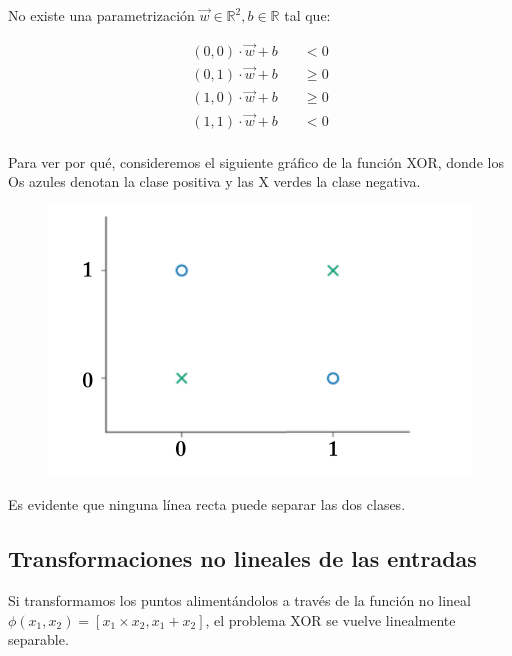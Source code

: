 No existe una parametrización $\vec{w} \in \mathbb{R}^2, b \in \mathbb{R}$ tal que:

\begin{equation}
\begin{split}
(0,0) \cdot \vec{w} + b \quad & < 0 \\
(0,1) \cdot \vec{w} + b \quad & \geq 0 \\
(1,0) \cdot \vec{w} + b \quad & \geq 0 \\
(1,1) \cdot \vec{w} + b \quad & < 0 \\
\end{split}
\end{equation}

Para ver por qué, consideremos el siguiente gráfico de la función XOR, donde los Os azules denotan la clase positiva y las X verdes la clase negativa.

\begin{figure}[htb]
	\centering
	 \includegraphics[scale=0.35]{pics/xor.png}
\end{figure}

Es evidente que ninguna línea recta puede separar las dos clases.


\subsection{Transformaciones no lineales de las entradas}
Si transformamos los puntos alimentándolos a través de la función no lineal $\phi(x_1,x_2) = [x_1 \times x_2, x_1 + x_2]$, el problema XOR se vuelve linealmente separable.

